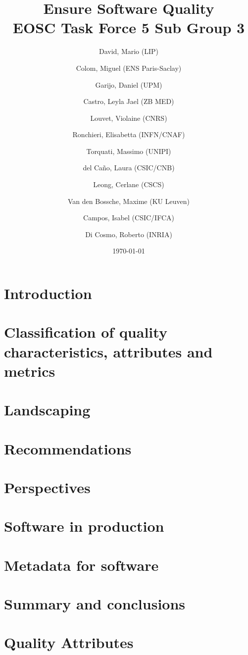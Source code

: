 \documentclass[a4paper]{article}
\title{Ensure Software Quality \\
    \large EOSC Task Force 5 Sub Group 3}
\author{
    David, Mario (LIP) \orcidlink{0000-0003-1802-5356} \and
    Colom, Miguel (ENS Paris-Saclay) \orcidlink{0000-0003-2636-0656} \and
    Garijo, Daniel (UPM) \orcidlink{0000-0003-0454-7145} \and
    Castro, Leyla Jael (ZB MED) \orcidlink{0000-0003-3986-0510} \and
    Louvet, Violaine (CNRS) \orcidlink{0000-0002-8742-8952} \and
    Ronchieri, Elisabetta (INFN/CNAF) \orcidlink{0000-0002-7341-6491} \and
    Torquati, Massimo (UNIPI) \orcidlink{0000-0001-6323-3459} \and
    del Ca\~{n}o, Laura (CSIC/CNB) \orcidlink{0000-0003-0981-2040} \and
    Leong, Cerlane (CSCS)  \orcidlink{0000-0001-8241-6277} \and
    Van den Bossche, Maxime (KU Leuven) \orcidlink{0000-0002-0938-0156} \and
    Campos, Isabel (CSIC/IFCA) \orcidlink{0000-0002-9350-0383} \and
    Di Cosmo, Roberto (INRIA) \orcidlink{0000-0002-7493-5349}
}
\date{\today}
\begin{document}
\maketitle

\tableofcontents
\thispagestyle{empty} 

\clearpage
{} 

\section{Introduction}
\label{sec:introduction}

\newpage

\section{Classification of quality characteristics, attributes and metrics}
\label{sec:classification}

\newpage

\section{Landscaping}
\label{sec:landscaping}

\newpage

\section{Recommendations}
\label{sec:recommendations}

\newpage

\section{Perspectives}
\label{sec:perspectives}

\newpage

\section{Software in production}
\label{sec:sw_in_prod}

\newpage

\section{Metadata for software}
\label{sec:metadata}

\newpage

\section{Summary and conclusions}
\label{sec:summary}

\newpage

\appendix
\section{Quality Attributes}
\label{appendix_qa}


\newpage
\printbibliography
\end{document}
